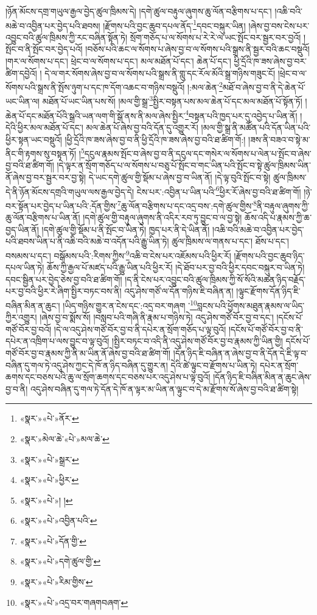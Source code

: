 །ཉོན་མོངས་དགྲ་གཡུལ་རྒྱལ་བྱེད་ཚུལ་ཁྲིམས་དེ། །དགེ་ཚུལ་བརྟུལ་ཞུགས་ཆུ་ལོན་བརྩིགས་པ་དང་། །འཆི་བའི་མཆེ་བ་འབྱིན་པར་བྱེད་པའི་ཐབས། །རྫོགས་པའི་བྱང་ཆུབ་དཔལ་ནོད་\footnote{«སྣར་»«པེ་»ནོར་}དབང་བསྐུར་ཡིན། །ཞེས་བྱ་བས་ངེས་པར་འབྱུང་བའི་ཚུལ་ཁྲིམས་ཀྱི་རང་བཞིན་སྟོན་ཏེ། སྲོག་གཅོད་པ་ལ་སོགས་པ་རེ་རེ་ལ་ཡང་སྤོང་བར་སྦྱར་བར་བྱའོ། །སྤོང་བ་ནི་སྤོང་བར་བྱེད་པའོ། །བཅོས་པའི་ཆང་ལ་སོགས་པ་ཞེས་བྱ་བ་ལ་སོགས་པའི་སྒྲས་ནི་སྦྱར་བའི་ཆང་བསྡུའོ། །གར་ལ་སོགས་པ་དང་། ཕྲེང་བ་ལ་སོགས་པ་དང་། མལ་མཐོན་པོ་དང་། ཆེན་པོ་དང་། ཕྱི་དྲོའི་ཁ་ཟས་ཞེས་བྱ་བར་ཚིག་དབྱེའོ། །
དེ་ལ་གར་སོགས་ཞེས་བྱ་བ་ལ་སོགས་པའི་སྒྲས་ནི་གླུ་དང་རོལ་མོའི་སྒྲ་གཉིས་གཟུང་ངོ། །ཕྲེང་བ་ལ་སོགས་པའི་སྒྲས་ནི་སྤོས་ཉུག་པ་དང་ཁ་དོག་འཆང་བ་གཉིས་བསྡུའོ། །:མལ་ཆེན་\footnote{«སྣར་»མེལ་ཆེ་«པེ་»མལ་ཆེ་}མཐོ་བ་ཞེས་བྱ་བ་ནི་དེ་ཆེན་པོ་ཡང་ཡིན་ལ། མཐོན་པོ་ཡང་ཡིན་པས་སོ། །མལ་གྱི་སྒྲ་\footnote{«སྣར་»«པེ་»སྒྲར་}སྤྱིར་བསྟན་པས་མལ་ཆེན་པོ་དང་མལ་མཐོན་པོ་སྟོན་ཏོ། །ཆེན་པོ་དང་མཐོན་པོའི་སྒྲའི་ཡན་ལག་གི་སྒོ་ནས་ནི་མལ་ཞེས་སྤྱིར་\footnote{«སྣར་»«པེ་»ཕྱིར་}བསྟན་པའི་ཁྱད་པར་དུ་འབྱེད་པ་ཡིན་ནོ། །དེའི་ཕྱིར་མལ་མཐོན་པོ་དང་། མལ་ཆེན་པོ་ཞེས་བྱ་བའི་དོན་དུ་འགྱུར་རོ། །མལ་གྱི་སྒྲ་ནི་མཚོན་པའི་དོན་ཡིན་པའི་ཕྱིར་སྟན་ཡང་བསྡུའོ། །ཕྱི་དྲོའི་ཁ་ཟས་ཞེས་བྱ་བ་ནི་ཕྱི་དྲོའི་ཁ་ཟས་ཞེས་བྱ་བའི་ཐ་ཚིག་གོ:། །ཟས་ནི་བཟའ་བ་སྟེ་མ་ནིང་གི་རྟགས་སུ་བསྟན་ཏོ། །\footnote{«སྣར་»«པེ་»། །}དངུལ་རྣམས་སྤོང་བ་ཞེས་བྱ་བ་ནི་དངུལ་དང་གསེར་ལ་སོགས་པ་ལེན་པ་སྤོང་བ་ཞེས་བྱ་བའི་ཐ་ཚིག་གོ། །དེ་ལྟར་ན་སྲོག་གཅོད་པ་ལ་སོགས་པ་བཅུ་པོ་སྤོང་བ་གང་ཡིན་པའི་སྤོང་བ་སྟེ་ཚུལ་ཁྲིམས་ཡིན་ནོ་ཞེས་བྱ་བར་སྦྱར་བར་བྱ་སྟེ། དེ་ཡང་དགེ་ཚུལ་གྱི་སྡོམ་པ་ཞེས་བྱ་བ་ཡིན་ནོ། །དེ་ལྟ་བུའི་སྤོང་བ་སྟེ། ཚུལ་ཁྲིམས་དེ་ནི་ཉོན་མོངས་དགྲའི་གཡུལ་ལས་རྒྱལ་བྱེད་དེ། ངེས་པར་:འབྱིན་པ་ཡིན་པའི་\footnote{«སྣར་»«པེ་»འབྱིན་པའི་}ཕྱིར་རོ་ཞེས་བྱ་བའི་ཐ་ཚིག་གོ། །ཉེ་བར་སྟོན་པར་བྱེད་པ་ཡིན་པའི་:དོན་གྱིས་\footnote{«སྣར་»«པེ་»དོན་གྱི་}ཆུ་ལོན་བརྩིགས་པ་དང་འདྲ་བས་:དགེ་ཚུལ་གྱིས་\footnote{«སྣར་»«པེ་»དགེ་ཚུལ་གྱི་}ནི་བརྟུལ་ཞུགས་ཀྱི་ཆུ་ལོན་བརྩིགས་པ་ཡིན་ནོ། །དགེ་ཚུལ་གྱི་བརྟུལ་ཞུགས་ནི་འདིར་རབ་ཏུ་བྱུང་བ་ལ་བྱ་སྟེ། ཆོས་འདི་པ་རྣམས་ཀྱི་ཆ་བྱད་ཡིན་ནོ། །དགེ་ཚུལ་གྱི་སྡོམ་པ་ནི་སྤོང་བ་ཡིན་ཏེ། ཁྱད་པར་ནི་དེ་ཡིན་ནོ། །འཆི་བའི་མཆེ་བ་འབྱིན་པར་བྱེད་པའི་ཐབས་ཡིན་པ་ནི་འཆི་བའི་མཆེ་བ་འདོན་པའི་རྒྱུ་ཡིན་ཏེ། ཚུལ་ཁྲིམས་ལ་གནས་པ་དང་། ཐོས་པ་དང་། བསམས་པ་དང་། བསྒོམས་པའི་:རིགས་ཀྱིས་\footnote{«སྣར་»«པེ་»རིམ་གྱིས་}འཆི་བ་ངེས་པར་འཇོམས་པའི་ཕྱིར་རོ། །རྫོགས་པའི་བྱང་ཆུབ་ཉིད་དཔལ་ཡིན་ཏེ། ཆོས་ཀྱི་རྒྱལ་པོ་མཛད་པའི་རྒྱུ་ཡིན་པའི་ཕྱིར་རོ། །དེ་ཐོབ་པར་བྱ་བའི་ཕྱིར་དབང་བསྐུར་བ་ཡིན་ཏེ། དབང་སྦྱིན་པར་བྱེད་ཅེས་བྱ་བའི་ཐ་ཚིག་གོ། །ད་ནི་ངེས་པར་འབྱུང་བའི་ཚུལ་ཁྲིམས་ཀྱི་སོ་སོའི་མཚན་ཉིད་བརྗོད་པར་བྱ་བའི་ཕྱིར་རེ་ཞིག་སྤྱིར་བཏང་བས་ནི། འདུ་ཤེས་གཙོ་ལ་དོན་གཉིས་ཇི་བཞིན་ན། །ལྟུང་རྫོགས་དོན་ཉིད་ཇི་བཞིན་མིན་ན་ཆུང་། །ཡིད་གཉིས་གྱུར་ན་ངེས་དང་:འདྲ་བར་གཞག ་\footnote{«སྣར་»«པེ་»འདྲ་བར་གཞགབཞག་}བླངས་པའི་ཕྱོགས་མཐུན་རྣམས་ལ་ཡིད་ཀྱིར་འགྱུར། །ཞེས་བྱ་བ་སྨོས་སོ། །བསླབ་པའི་གཞི་ནི་རྣམ་པ་གཉིས་ཏེ། འདུ་ཤེས་གཙོ་བོར་བྱ་བ་དང་། །དངོས་པོ་གཙོ་བོར་བྱ་བའོ། །དེ་ལ་འདུ་ཤེས་གཙོ་བོར་བྱ་བ་ནི་དཔེར་ན་སྲོག་གཅོད་པ་ལྟ་བུའོ། །དངོས་པོ་གཙོ་བོར་བྱ་བ་ནི་དཔེར་ན་འཁྲིག་པ་ལས་བྱུང་བ་ལྟ་བུའོ། །སྤྱིར་བཏང་བ་འདི་ནི་འདུ་ཤེས་གཙོ་བོར་བྱ་བ་རྣམས་ཀྱི་ཡིན་གྱི། དངོས་པོ་གཙོ་བོར་བྱ་བ་རྣམས་ཀྱི་ནི་མ་ཡིན་ནོ་ཞེས་བྱ་བའི་ཐ་ཚིག་གོ། །དོན་ཉིད་ཇི་བཞིན་ན་ཞེས་བྱ་བ་ནི་དོན་དེ་ཇི་ལྟ་བ་བཞིན་དུ་གལ་ཏེ་འདུ་ཤེས་ཀྱང་དེ་ཁོ་ན་ཉིད་བཞིན་དུ་གྱུར་ན། དེའི་ཚེ་ལྟུང་བ་རྫོགས་པ་ཡིན་ཏེ། དཔེར་ན་སྲོག་ཆགས་དང་བཅས་པའི་ཆུ་ལ་སྲོག་ཆགས་དང་བཅས་པར་འདུ་ཤེས་པ་ལྟ་བུའོ། །དོན་ཉིད་ཇི་བཞིན་མིན་ན་ཆུང་ཞེས་བྱ་བ་ནི། འདུ་ཤེས་བཞིན་དུ་གལ་ཏེ་དོན་དེ་ཁོ་ན་ལྟར་མ་ཡིན་ན་ལྟུང་བ་དེ་མ་རྫོགས་སོ་ཞེས་བྱ་བའི་ཐ་ཚིག་སྟེ། 